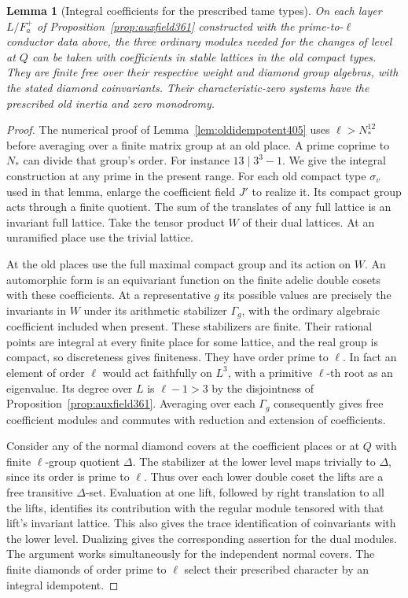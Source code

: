 \documentclass[a4paper,11pt]{article}
\newtheorem{lemma}[proposition]{Lemma}
\theoremstyle{definition}
\theoremstyle{remark}
\numberwithin{equation}{section}
\begin{document}
\begin{lemma}[Integral coefficients for the prescribed tame types]\leavevmode
\label{lem:typelattice427}
On each layer \(L/F_a^+\) of Proposition~\ref{prop:auxfield361}
constructed with the prime-to-\(\ell\) conductor data above,
the three ordinary modules needed for the changes of level at \(Q\)
can be taken with coefficients in stable lattices in the old
compact types. They are finite free over their respective
weight and diamond group algebras, with the stated diamond
coinvariants. Their characteristic-zero systems have the prescribed
old inertia and zero monodromy.
\end{lemma}
\begin{proof}
The numerical proof of Lemma~\ref{lem:oldidempotent405}
uses \(\ell>N_*^{12}\) before averaging over a finite matrix
group at an old place. A prime coprime to \(N_*\) can divide
that group's order. For instance \(13\mid 3^3-1\).
We give the integral construction at any prime in the present
range. For each old compact type \(\sigma_v\) used in that
lemma, enlarge the coefficient field \(J'\) to realize it.
Its compact group acts through a finite quotient. The sum
of the translates of any full lattice is an invariant full
lattice. Take the tensor product \(W\) of their dual lattices.
At an unramified place use the trivial lattice.

At the old places use the full maximal compact group and its
action on \(W\). An automorphic form is an equivariant function
on the finite adelic double cosets with these coefficients.
At a representative \(g\) its possible values are precisely
the invariants in \(W\) under its arithmetic stabilizer
\(\Gamma_g\), with the ordinary algebraic coefficient included
when present. These stabilizers are finite. Their rational
points are integral at every finite place for some lattice,
and the real group is compact, so discreteness gives finiteness.
They have order prime to \(\ell\). In fact an element of order
\(\ell\) would act faithfully on \(L^3\), with a primitive
\(\ell\)-th root as an eigenvalue. Its degree over \(L\) is
\(\ell-1>3\) by the disjointness of
Proposition~\ref{prop:auxfield361}. Averaging over each
\(\Gamma_g\) consequently gives free coefficient modules and
commutes with reduction and extension of coefficients.

Consider any of the normal diamond covers at the coefficient
places or at \(Q\) with finite \(\ell\)-group quotient \(\Delta\).
The stabilizer at the lower level maps trivially to \(\Delta\),
since its order is prime to \(\ell\). Thus over each lower
double coset the lifts are a free transitive \(\Delta\)-set.
Evaluation at one lift, followed by right translation to all
the lifts, identifies its contribution with the regular
module tensored with that lift's invariant lattice. This
also gives the trace identification of coinvariants with the
lower level. Dualizing gives the corresponding assertion for
the dual modules. The argument works simultaneously for
the independent normal covers. The finite diamonds of order
prime to \(\ell\) select their prescribed character by an
integral idempotent.


\end{proof}
\end{document}
